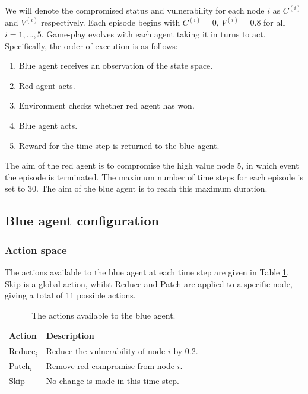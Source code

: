 \documentclass{article}
\begin{document}
\noindent We will denote the compromised status and vulnerability for each node $i$ as $C^{(i)}$ and $V^{(i)}$ respectively. Each episode begins with $C^{(i)} = 0$, $V^{(i)} = 0.8$ for all $i = 1,...,5$. Game-play evolves with each agent taking it in turns to act. Specifically, the order of execution is as follows:
\begin{enumerate}
    \item Blue agent receives an observation of the state space.
    \item Red agent acts.
    \item Environment checks whether red agent has won.
    \item Blue agent acts.
    \item Reward for the time step is returned to the blue agent.
    
\end{enumerate}

The aim of the red agent is to compromise the high value node 5, in which event the episode is terminated. The maximum number of time steps for each episode is set to 30. The aim of the blue agent is to reach this maximum duration.

\subsection{Blue agent configuration}

\subsubsection{Action space}

The actions available to the blue agent at each time step are given in Table \ref{tab:blue_actions}. Skip is a global action, whilst Reduce and Patch are applied to a specific node, giving a total of 11 possible actions.

\begin{table}[h!]
    \centering
    \small
    \begin{tabular}{ | m{} | m{}|} 
      \hline
       \textbf{Action} & \textbf{Description} \\ 
      \hline
        Reduce$_i$ & Reduce the vulnerability of node $i$ by 0.2. \\ 
      \hline
        Patch$_i$ &  Remove red compromise from node $i$. \\ 
      \hline
        Skip &  No change is made in this time step. \\ 
      \hline
      
    \end{tabular}
    \caption{The actions available to the blue agent.}
    \label{tab:blue_actions}
\end{table}
\end{document}
